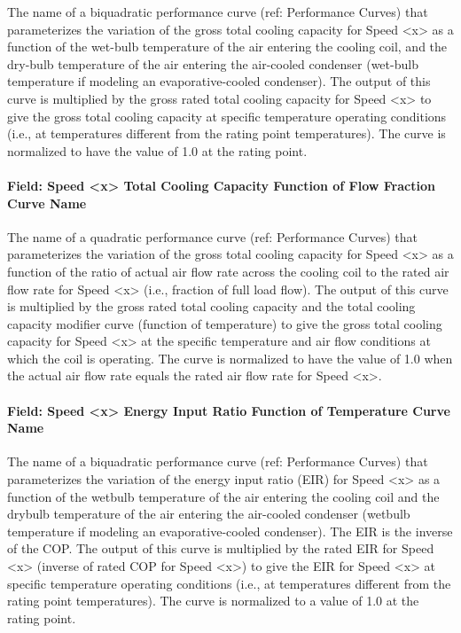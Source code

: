 The name of a biquadratic performance curve (ref: Performance Curves) that parameterizes the variation of the gross total cooling capacity for Speed \textless{}x\textgreater{} as a function of the wet-bulb temperature of the air entering the cooling coil, and the dry-bulb temperature of the air entering the air-cooled condenser (wet-bulb temperature if modeling an evaporative-cooled condenser). The output of this curve is multiplied by the gross rated total cooling capacity for Speed \textless{}x\textgreater{} to give the gross total cooling capacity at specific temperature operating conditions (i.e., at temperatures different from the rating point temperatures). The curve is normalized to have the value of 1.0 at the rating point.

\paragraph{Field: Speed \textless{}x\textgreater{} Total Cooling Capacity Function of Flow Fraction Curve Name}\label{field-speed-x-total-cooling-capacity-function-of-flow-fraction-curve-name}

The name of a quadratic performance curve (ref: Performance Curves) that parameterizes the variation of the gross total cooling capacity for Speed \textless{}x\textgreater{} as a function of the ratio of actual air flow rate across the cooling coil to the rated air flow rate for Speed \textless{}x\textgreater{} (i.e., fraction of full load flow). The output of this curve is multiplied by the gross rated total cooling capacity and the total cooling capacity modifier curve (function of temperature) to give the gross total cooling capacity for Speed \textless{}x\textgreater{} at the specific temperature and air flow conditions at which the coil is operating. The curve is normalized to have the value of 1.0 when the actual air flow rate equals the rated air flow rate for Speed \textless{}x\textgreater{}.

\paragraph{Field: Speed \textless{}x\textgreater{} Energy Input Ratio Function of Temperature Curve Name}\label{field-speed-x-energy-input-ratio-function-of-temperature-curve-name}

The name of a biquadratic performance curve (ref: Performance Curves) that parameterizes the variation of the energy input ratio (EIR) for Speed \textless{}x\textgreater{} as a function of the wetbulb temperature of the air entering the cooling coil and the drybulb temperature of the air entering the air-cooled condenser (wetbulb temperature if modeling an evaporative-cooled condenser). The EIR is the inverse of the COP. The output of this curve is multiplied by the rated EIR for Speed \textless{}x\textgreater{} (inverse of rated COP for Speed \textless{}x\textgreater{}) to give the EIR for Speed \textless{}x\textgreater{} at specific temperature operating conditions (i.e., at temperatures different from the rating point temperatures). The curve is normalized to a value of 1.0 at the rating point.

